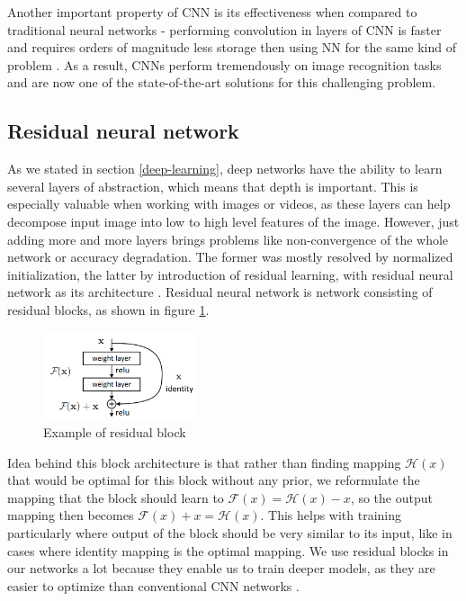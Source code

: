     \newline
    Another important property of CNN is its effectiveness when compared to traditional neural networks - performing convolution in layers of CNN is faster and requires orders of magnitude less storage then using NN for the same kind of problem \cite{deep-learning}. As a result, CNNs perform tremendously on image recognition tasks and are now one of the state-of-the-art solutions for this challenging problem.
    \subsection{Residual neural network}
    As we stated in section \ref{deep-learning}, deep networks have the ability to learn several layers of abstraction, which means that depth is important. This is especially valuable when working with images or videos, as these layers can help decompose input image into low to high level features of the image. However, just adding more and more layers brings problems like non-convergence of the whole network or 
    accuracy degradation. The former was mostly resolved by normalized initialization, the latter by introduction of residual learning, with residual neural network as its architecture \cite{residual-network}. Residual neural network is network consisting of residual blocks, as shown in figure \ref{fig:res_block}.
    \begin{figure}
        \centerline{\includegraphics[width=0.4\textwidth]{praca/images/residual-block.png}}
        \caption[Example of residual block]{Example of residual block}
        \label{fig:res_block}
    \end{figure}
    Idea behind this block architecture is that rather than finding mapping $\mathcal{H}(x)$ that would be optimal for this block without any prior, we reformulate the mapping that the block should learn to $\mathcal{F}(x) = \mathcal{H}(x) - x$, so the output mapping then becomes $\mathcal{F}(x) + x = \mathcal{H}(x)$. This helps with training particularly where output of the block should be very similar to its input, like in cases where identity mapping is the optimal mapping. We use residual blocks in our networks a lot because they enable us to train deeper models, as they are easier to optimize than conventional CNN networks \cite{residual-network}.